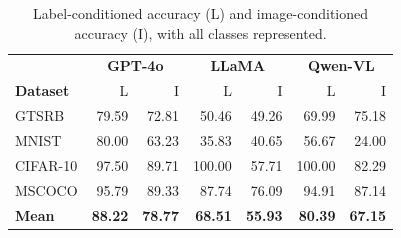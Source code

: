 \begin{table}[t]
\centering
\caption{Label-conditioned accuracy (L) and image-conditioned accuracy (I), with all classes represented.}
\label{tab:grounding}
\footnotesize
\begin{tabular}{@{}lrrrrrr@{}}
\toprule
 & \multicolumn{2}{c}{\textbf{GPT-4o}} & \multicolumn{2}{c}{\textbf{LLaMA}} & \multicolumn{2}{c}{\textbf{Qwen-VL}} \\
\textbf{Dataset} & L & I & L & I & L & I \\
\midrule
GTSRB & 79.59 & 72.81 & 50.46 & 49.26 & 69.99 & 75.18 \\
MNIST & 80.00 & 63.23 & 35.83 & 40.65 & 56.67 & 24.00 \\
CIFAR-10 & 97.50 & 89.71 & 100.00 & 57.71 & 100.00 & 82.29 \\
MSCOCO & 95.79 & 89.33 & 87.74 & 76.09 & 94.91 & 87.14 \\
\midrule
\textbf{Mean} & \textbf{88.22} & \textbf{78.77} & \textbf{68.51} & \textbf{55.93} & \textbf{80.39} & \textbf{67.15} \\
\bottomrule
\end{tabular}
\end{table}
